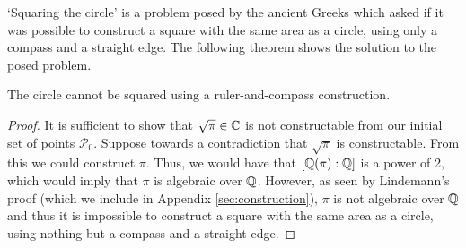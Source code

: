 `Squaring the circle' is a problem posed by the ancient Greeks which asked if it was possible to construct a square with the same area as a circle, using only a compass and a straight edge. The following theorem shows the solution to the posed problem.

\begin{theorem}
    The circle cannot be squared using a ruler-and-compass construction.
\end{theorem}

\begin{proof}  
    
    It is sufficient to show that $\sqrt{\pi}\in \mathbb C$ is not constructable from our initial set of points $\mathcal{P}_0$. Suppose towards a contradiction that $\sqrt \pi$ is constructable. From this we could construct $\pi$. Thus, we would have that $[\mathbb Q(\pi):\mathbb Q]$ is a power of 2, which would imply that $\pi$ is algebraic over $\mathbb Q$. However, as seen by Lindemann's proof (which we include in Appendix \ref{sec:construction}), $\pi$ is not algebraic over $\mathbb Q$ and thus it is impossible to construct a square with the same area as a circle, using nothing but a compass and a straight edge.
\end{proof}
